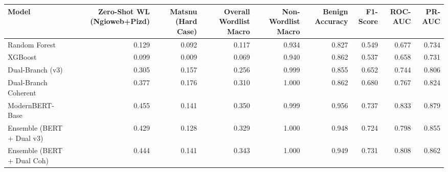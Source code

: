 \begin{tabular}{lrrrrrrrr}
\toprule
Model & Zero-Shot WL (Ngioweb+Pizd) & Matsnu (Hard Case) & Overall Wordlist Macro & Non-Wordlist Macro & Benign Accuracy & F1-Score & ROC-AUC & PR-AUC \\
\midrule
Random Forest & 0.129 & 0.092 & 0.117 & 0.934 & 0.827 & 0.549 & 0.677 & 0.734 \\
XGBoost & 0.099 & 0.009 & 0.069 & 0.940 & 0.862 & 0.537 & 0.658 & 0.731 \\
Dual-Branch (v3) & 0.305 & 0.157 & 0.256 & 0.999 & 0.855 & 0.652 & 0.744 & 0.806 \\
Dual-Branch Coherent & 0.377 & 0.176 & 0.310 & 1.000 & 0.862 & 0.680 & 0.767 & 0.824 \\
ModernBERT-Base & 0.455 & 0.141 & 0.350 & 0.999 & 0.956 & 0.737 & 0.833 & 0.879 \\
Ensemble (BERT + Dual v3) & 0.429 & 0.128 & 0.329 & 1.000 & 0.948 & 0.724 & 0.798 & 0.855 \\
Ensemble (BERT + Dual Coh) & 0.444 & 0.141 & 0.343 & 1.000 & 0.949 & 0.731 & 0.808 & 0.862 \\
\bottomrule
\end{tabular}
